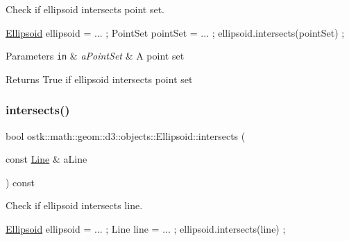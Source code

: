 Check if ellipsoid intersects point set. 


\begin{DoxyCode}
\hyperlink{classostk_1_1math_1_1geom_1_1d3_1_1objects_1_1_ellipsoid_a106c71abf9503f3d06b2613c1c7e9d65}{Ellipsoid} ellipsoid = ... ;
PointSet pointSet = ... ;
ellipsoid.intersects(pointSet) ;
\end{DoxyCode}



\begin{DoxyParams}[1]{Parameters}
\mbox{\tt in}  & {\em a\+Point\+Set} & A point set \\
\hline
\end{DoxyParams}
\begin{DoxyReturn}{Returns}
True if ellipsoid intersects point set 
\end{DoxyReturn}
\mbox{\label{classostk_1_1math_1_1geom_1_1d3_1_1objects_1_1_ellipsoid_ade6288d324e3227eafd0126fc4680471}} 
\subsubsection{\texorpdfstring{intersects()}{intersects()}\hspace{0.1cm}{\footnotesize\ttfamily [3/10]}}
{\footnotesize\ttfamily bool ostk\+::math\+::geom\+::d3\+::objects\+::\+Ellipsoid\+::intersects (\begin{DoxyParamCaption}\item[{const \hyperlink{classostk_1_1math_1_1geom_1_1d3_1_1objects_1_1_line}{Line} \&}]{a\+Line }\end{DoxyParamCaption}) const}



Check if ellipsoid intersects line. 


\begin{DoxyCode}
\hyperlink{classostk_1_1math_1_1geom_1_1d3_1_1objects_1_1_ellipsoid_a106c71abf9503f3d06b2613c1c7e9d65}{Ellipsoid} ellipsoid = ... ;
Line line = ... ;
ellipsoid.intersects(line) ;
\end{DoxyCode}



